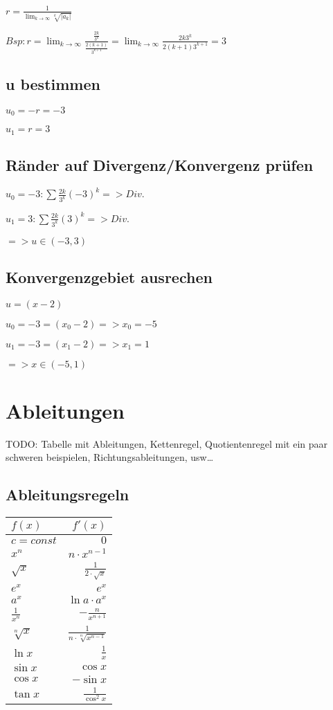 \documentclass[a4paper, 12pt]{article}
\begin{document}
$ r = \frac {1} {\lim_{k \to \infty} \sqrt[k]{|a_k|}}$

$Bsp: r = \lim_{k \to
	\infty} \frac {\frac {2k} {3^k}}{\frac{2(k+1)}{3^{k+1}}} = \lim_{k \to \infty}
	\frac {2k 3^k} {2(k+1) 3^{k+1}} = 3$

	\subsection { u bestimmen}

	$u_0 = -r = -3$

	$u_1 =  r = 3$

	\subsection { Ränder auf Divergenz/Konvergenz prüfen}

	$u_0 = -3: \sum \frac{2k} {3^k} (-3)^k => Div.$

	$u_1 = 3: \sum \frac{2k} {3^k} (3)^k => Div.$    

	$=> u \in (-3, 3)$

	\subsection { Konvergenzgebiet ausrechen}

	$u = (x - 2)$

	$u_0 = -3 = (x_0 - 2) => x_0 = -5$

	$u_1 = -3 = (x_1 - 2) => x_1 = 1$

	$=> x \in (-5, 1)$ 


	\section{Ableitungen}

TODO: Tabelle mit Ableitungen, Kettenregel, Quotientenregel mit ein paar
schweren beispielen, Richtungsableitungen, usw\ldots 
\subsection{Ableitungsregeln}
\renewcommand{\arraystretch}{1.5}

\begin{tabular}{l | r} 
	$f(x)$ & $f'(x)$\\
	\hline 
	$c = const$ & $0$\\
	$x^n$ & $n \cdot x^{n-1}$\\
	$\sqrt{x}$ & $\frac{1}{2\cdot\sqrt{x}}$\\
	$e^x$ & $e^x$\\
	$a^x$ & $\ln{a} \cdot a^x$\\
	$\frac{1}{x^n}$ & $- \frac{n}{x^{n+1}}$\\
	$\sqrt[n]{x}$ & $\frac{1}{n \cdot \sqrt[n]{x^{n-1}}}$\\
	$\ln{x}$ & $\frac{1}{x}$\\
	$\sin{x}$ & $\cos{x}$\\
	$\cos{x}$ & $-\sin{x}$\\
	$\tan{x}$ & $\frac{1}{\cos^2{x}}$\\
\end{tabular} \newpage
\end{document}
